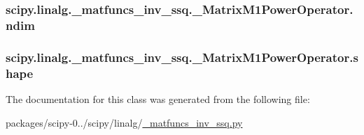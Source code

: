 \subsubsection[{ndim}]{\setlength{\rightskip}{0pt plus 5cm}scipy.\+linalg.\+\_\+matfuncs\+\_\+inv\+\_\+ssq.\+\_\+\+Matrix\+M1\+Power\+Operator.\+ndim}\label{classscipy_1_1linalg_1_1__matfuncs__inv__ssq_1_1__MatrixM1PowerOperator_a43bc0774b6f206b07ca3ae68c50d0cac}
\hypertarget{classscipy_1_1linalg_1_1__matfuncs__inv__ssq_1_1__MatrixM1PowerOperator_a96d3e2445a6e8839fc893d2ae58f6f26}{}
\subsubsection[{shape}]{\setlength{\rightskip}{0pt plus 5cm}scipy.\+linalg.\+\_\+matfuncs\+\_\+inv\+\_\+ssq.\+\_\+\+Matrix\+M1\+Power\+Operator.\+shape}\label{classscipy_1_1linalg_1_1__matfuncs__inv__ssq_1_1__MatrixM1PowerOperator_a96d3e2445a6e8839fc893d2ae58f6f26}


The documentation for this class was generated from the following file\+:\begin{DoxyCompactItemize}
\item 
packages/scipy-\/0../scipy/linalg/\hyperlink{__matfuncs__inv__ssq_8py}{\+\_\+matfuncs\+\_\+inv\+\_\+ssq.\+py}\end{DoxyCompactItemize}
